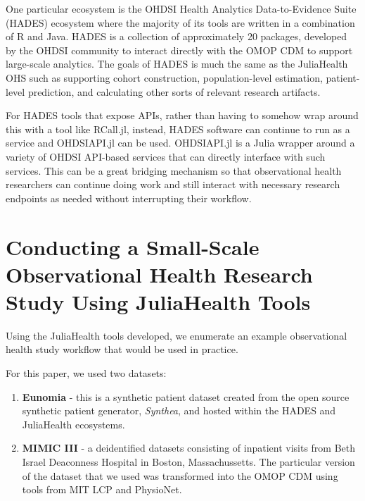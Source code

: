 \documentclass{juliacon}
\begin{document}
One particular ecosystem is the OHDSI Health Analytics Data-to-Evidence Suite (HADES) ecosystem where the majority of its tools are written in a combination of R and Java.
HADES is a collection of approximately 20 packages, developed by the OHDSI community to interact directly with the OMOP CDM to support large-scale analytics.
The goals of HADES is much the same as the JuliaHealth OHS such as supporting cohort construction, population-level estimation, patient-level prediction, and calculating other sorts of relevant research artifacts.

For HADES tools that expose APIs, rather than having to somehow wrap around this with a tool like RCall.jl, instead, HADES software can continue to run as a service and OHDSIAPI.jl can be used.
OHDSIAPI.jl is a Julia wrapper around a variety of OHDSI API-based services that can directly interface with such services.
This can be a great bridging mechanism so that observational health researchers can continue doing work and still interact with necessary research endpoints as needed without interrupting their workflow.

\section{Conducting a Small-Scale Observational Health Research Study Using JuliaHealth Tools}

Using the JuliaHealth tools developed, we enumerate an example observational health study workflow that would be used in practice.\footnotemark

For this paper, we used two datasets: 

\begin{enumerate}

\item \textbf{Eunomia} - this is a synthetic patient dataset created from the open source synthetic patient generator, \textit{Synthea}, and hosted within the HADES and JuliaHealth ecosystems.

\item \textbf{MIMIC III} - a deidentified datasets consisting of inpatient visits from Beth Israel Deaconness Hospital in Boston, Massachussetts.
The particular version of the dataset that we used was transformed into the OMOP CDM using tools from MIT LCP and PhysioNet. \cite{physionet, hripcsakCharacterizingTreatmentPathways2016, johnson2016mimic, johnson2018mimic}

\end{enumerate}
\end{document}
